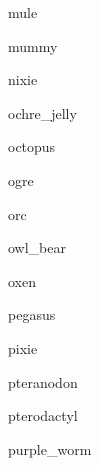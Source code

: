 \documentclass[letterpaper,serif]{module}
\begin{document}
\begin{newmonster}{mule}\end{newmonster}

\begin{newmonster}{mummy}\end{newmonster}

\begin{newmonster}{nixie}\end{newmonster}

\begin{newmonster}{ochre_jelly}\end{newmonster}

\begin{newmonster}{octopus}\end{newmonster}

\begin{newmonster}{ogre}\end{newmonster}

\begin{newmonster}{orc}\end{newmonster}

\begin{newmonster}{owl_bear}\end{newmonster}

\begin{newmonster}{oxen}\end{newmonster}

\begin{newmonster}{pegasus}\end{newmonster}

\begin{newmonster}{pixie}\end{newmonster}

\begin{newmonster}{pteranodon}\end{newmonster}

\begin{newmonster}{pterodactyl}\end{newmonster}

\begin{newmonster}{purple_worm}\end{newmonster}
\end{document}
